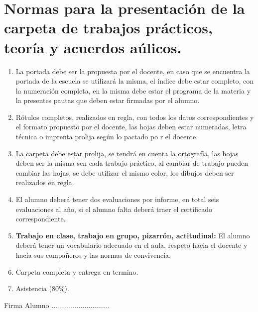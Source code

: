 \documentclass[../main]{subfiles}
\begin{document}
\section*{Normas para la presentación de la carpeta de trabajos
prácticos, teoría y acuerdos aúlicos.}
\begin{enumerate}
  \item La portada debe ser la propuesta por el docente, en caso que
    se encuentra la portada de la escuela se utilizará la misma, el
    índice debe estar completo, con la numeración completa, en la
    misma debe estar el programa de la materia y la presentes pautas
    que deben estar firmadas por el alumno.
  \item Rótulos completos, realizados en regla, con todos los datos
    correspondientes y el formato propuesto por el docente, las hojas
    deben estar numeradas, letra técnica o imprenta prolija según lo
    pactado po r el docente.
  \item La carpeta debe estar prolija, se tendrá en cuenta la
    ortografía, las hojas deben ser la misma sen cada trabajo
    práctico, al cambiar de trabajo pueden cambiar las hojas, se debe
    utilizar el mismo color, los dibujos deben ser
    realizados en regla.
  \item El alumno deberá tener dos evaluaciones por informe, en total
    seis evaluaciones al año, si el alumno falta deberá traer el
    certificado correspondiente.
  \item \textbf{Trabajo en clase, trabajo en grupo, pizarrón,
    actitudinal:} El alumno deberá tener un vocabulario adecuado en
    el aula, respeto hacia el docente y hacia sus compañeros y las
    normas de convivencia.
  \item Carpeta completa y entrega en termino.
  \item Asistencia (80\%).
\end{enumerate}
\vspace{1cm}
\begin{center}
  Firma Alumno $\dots\dots\dots\dots\dots\dots\dots\dots\dots\dots$

\end{center}

\tableofcontents
\end{document}
